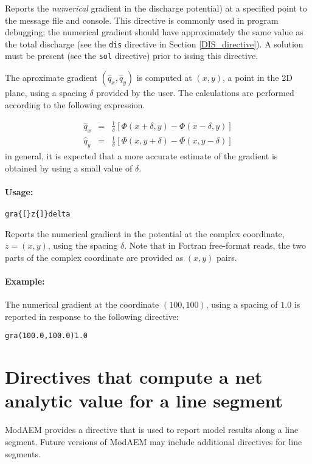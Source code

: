 Reports the \emph{numerical} gradient in the discharge potential)
at a specified point to the message
file and console. This directive is commonly used in program debugging;
the numerical gradient should have approximately the same value as
the total discharge (see the \texttt{dis} directive in Section \ref{DIS_directive}).
A solution must be present (see the \texttt{sol} directive) prior
to issing this directive. 

The aproximate gradient $(\hat{q}_{x},\hat{q}_{y})$ is computed at
$(x,y)$, a point in the 2D plane, using a spacing $\delta$ provided
by the user. The calculations are performed according to the following
expression.

\begin{eqnarray*}
\hat{q}_{x} & = & \frac{1}{\delta}\left[\Phi(x+\delta,y)-\Phi(x-\delta,y)\right]\\
\hat{q}_{y} & = & \frac{1}{\delta}\left[\Phi(x,y+\delta)-\Phi(x,y-\delta)\right]
\end{eqnarray*}
in general, it is expected that a more accurate estimate of the gradient
is obtained by using a small value of $\delta$.


\paragraph{Usage:}
\begin{verbatim}
gra{[}z{]}delta
\end{verbatim}
Reports the numerical gradient in the potential at the complex coordinate,
$z=(x,y)$, using the spacing $\delta$. Note that in Fortran free-format
reads, the two parts of the complex coordinate are provided as $(x,y)$
pairs. 


\paragraph{Example:}

The numerical gradient at the coordinate $(100,100)$, using a spacing
of $1.0$ is reported in response to the following directive:
\begin{verbatim}
gra(100.0,100.0)1.0
\end{verbatim}

\section{Directives that compute a net analytic value for a line segment}

ModAEM provides a directive that is used to report model results along
a line segment. Future versions of ModAEM may include additional directives
for line segments.


